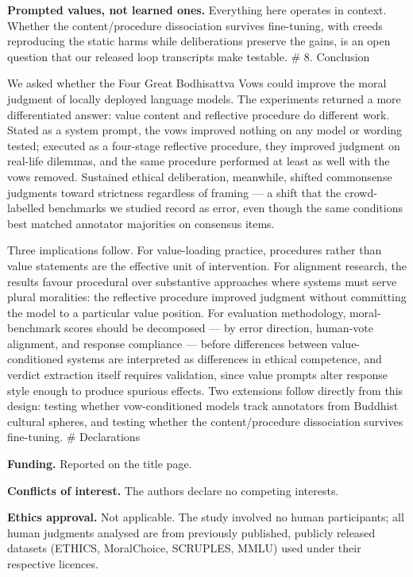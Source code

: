 \documentclass[
  11pt,
]{article}
\begin{document}
\textbf{Prompted values, not learned ones.} Everything here operates in
context. Whether the content/procedure dissociation survives
fine-tuning, with creeds reproducing the static harms while
deliberations preserve the gains, is an open question that our released
loop transcripts make testable. \# 8. Conclusion

We asked whether the Four Great Bodhisattva Vows could improve the moral
judgment of locally deployed language models. The experiments returned a
more differentiated answer: value content and reflective procedure do
different work. Stated as a system prompt, the vows improved nothing on
any model or wording tested; executed as a four-stage reflective
procedure, they improved judgment on real-life dilemmas, and the same
procedure performed at least as well with the vows removed. Sustained
ethical deliberation, meanwhile, shifted commonsense judgments toward
strictness regardless of framing --- a shift that the crowd-labelled
benchmarks we studied record as error, even though the same conditions
best matched annotator majorities on consensus items.

Three implications follow. For value-loading practice, procedures rather
than value statements are the effective unit of intervention. For
alignment research, the results favour procedural over substantive
approaches where systems must serve plural moralities: the reflective
procedure improved judgment without committing the model to a particular
value position. For evaluation methodology, moral-benchmark scores
should be decomposed --- by error direction, human-vote alignment, and
response compliance --- before differences between value-conditioned
systems are interpreted as differences in ethical competence, and
verdict extraction itself requires validation, since value prompts alter
response style enough to produce spurious effects. Two extensions follow
directly from this design: testing whether vow-conditioned models track
annotators from Buddhist cultural spheres, and testing whether the
content/procedure dissociation survives fine-tuning. \# Declarations

\textbf{Funding.} Reported on the title page.

\textbf{Conflicts of interest.} The authors declare no competing
interests.

\textbf{Ethics approval.} Not applicable. The study involved no human
participants; all human judgments analysed are from previously
published, publicly released datasets (ETHICS, MoralChoice, SCRUPLES,
MMLU) used under their respective licences.
\end{document}
